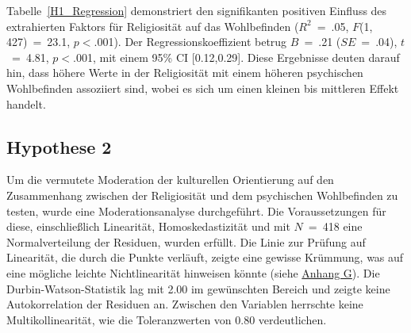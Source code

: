 
Tabelle~\ref{H1_Regression} demonstriert den signifikanten positiven Einfluss des extrahierten Faktors für Religiosität auf das Wohlbefinden ($R^{2}$~=~.05, $F$(1, 427)~=~23.1, $p<$.001). Der Regressionskoeffizient betrug $B$~=~.21 ($SE$~=~.04), $t$~=~4.81, $p<$.001, mit einem 95\% CI [0.12,0.29]. Diese Ergebnisse deuten darauf hin, dass höhere Werte in der Religiosität mit einem höheren psychischen Wohlbefinden assoziiert sind, wobei es sich um einen kleinen bis mittleren Effekt handelt.



\subsection{Hypothese 2}    \label{subsec_4.2.2}
Um die vermutete Moderation der kulturellen Orientierung auf den Zusammenhang zwischen der Religiosität und dem psychischen Wohlbefinden zu testen, wurde eine Moderationsanalyse durchgeführt.  
Die Voraussetzungen für diese, einschließlich Linearität, Homoskedastizität und mit $N$~=~418 eine Normalverteilung der Residuen, wurden erfüllt. Die Linie zur Prüfung auf Linearität, die durch die Punkte verläuft, zeigte eine gewisse Krümmung, was auf eine mögliche leichte Nichtlinearität hinweisen könnte (siehe \hyperref [H2_Voraussetzungen]{Anhang G}). Die Durbin-Watson-Statistik lag mit 2.00 im gewünschten Bereich und zeigte keine Autokorrelation der Residuen an. Zwischen den Variablen herrschte keine Multikollinearität, wie die Toleranzwerten von 0.80 verdeutlichen. 

